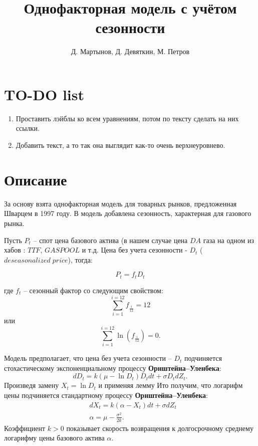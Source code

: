 \documentclass[12pt, a4paper]{article}
\begin{document}
\title{Однофакторная модель с учётом сезонности}
\author{Д. Мартынов, Д. Девяткин, М. Петров}
\maketitle

\tableofcontents

\section*{TO-DO list}
\begin{enumerate}
    \item Проставить лэйблы ко всем уравнениям, потом по тексту сделать на них ссылки.  
    \item Добавить текст, а то так она выглядит как-то очень верхнеуровнево.
\end{enumerate}
 
\section{Описание}

За основу взята однофакторная модель для товарных рынков, предложенная Шварцем в 1997 году.  В модель добавлена сезонность, характерная для газового рынка. 

Пусть $P_t$  -- спот цена базового актива (в нашем случае цена $DA$ газа на одном из хабов : $TTF$, $GASPOOL$ и т.д. Цена без учета сезонности - $D_t$ ($deseasonalized\; price$), тогда:

\begin{equation}
P_t = f_t D_t    
\end{equation}

где $f_t$ -- сезонный фактор со следующим свойством: 
\begin{equation}
    \sum_{i=1}^{i = 12} f_{\frac{i}{12}} = 12 
\end{equation}
\; \; \; или 
\begin{equation}
    \sum_{i=1}^{i = 12} \ln(f_{\frac{i}{12}}) = 0. 
\end{equation}

Модель предполагает, что цена без учета сезонности -- $D_t$ подчиняется стохастическому экспоненциальному процессу \textbf{Орнштейна--Уленбека}:
\begin{equation}
    dD_t = k(\mu - \ln{D_t})D_tdt + \sigma D_tdZ_t.
\end{equation}
Произведя замену $X_t = \ln D_t$ и применяя лемму Ито получим, что логарифм цены подчиняется стандартному процессу \textbf{Орнштейна--Уленбека}: 
\begin{equation}
    \begin{aligned}
    & dX_t = k(\alpha - X_t)dt + \sigma dZ_t \\
    & \alpha = \mu - \frac{\sigma^2}{2k}. 
    \end{aligned}
\end{equation}
Коэффициент $k > 0$ показывает скорость возвращения к долгосрочному среднему логарифму цены базового актива $\alpha$.
\end{document}

